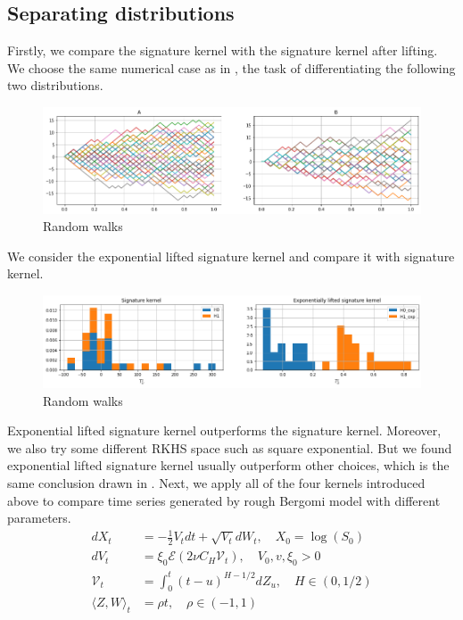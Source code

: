 \documentclass[12pt]{report}
\theoremstyle{definition}
\theoremstyle{remark}
\begin{document}
\subsection{Separating distributions}
Firstly, we compare the signature kernel with the signature kernel after lifting. We choose the same numerical case as in \cite{chevyrev2018signature}, the task of differentiating the following two distributions. 
 \begin{figure}[H]
    \centering
    \includegraphics[width=\textwidth]{figs/estimation1.png}
    \caption{Random walks}
\end{figure}
We consider the exponential lifted signature kernel and compare it with signature kernel. 
 \begin{figure}[H]
    \centering
    \includegraphics[width=\textwidth]{figs/estimation2.png}
    \caption{Random walks}
\end{figure}
Exponential lifted signature kernel outperforms the signature kernel. Moreover, we also try some different RKHS space such as square exponential. But we found exponential lifted signature kernel usually outperform other choices, which is the same conclusion drawn in \cite{chevyrev2018signature}. Next, we apply all of the four kernels introduced above to compare time series generated by rough Bergomi model with different parameters. 
\begin{equation}
  \begin{split}
    dX_{t} &= -\frac{1}{2}V_{t}dt + \sqrt{V_{t}}dW_{t}, \quad X_{0} = \log(S_{0})\\
    dV_{t} &= \xi_{0}\mathcal{E}(2\nu C_{H}\mathcal{V}_{t}),\quad V_{0}, v, \xi_{0} > 0\\
    \mathcal{V}_{t} &= \int_{0}^{t}(t-u)^{H - 1/2}dZ_{u},\quad H \in (0,1/2)\\
    \langle Z, W \rangle_{t} &= \rho t, \quad \rho \in (-1,1)
  \end{split}
\end{equation} 
\end{document}

